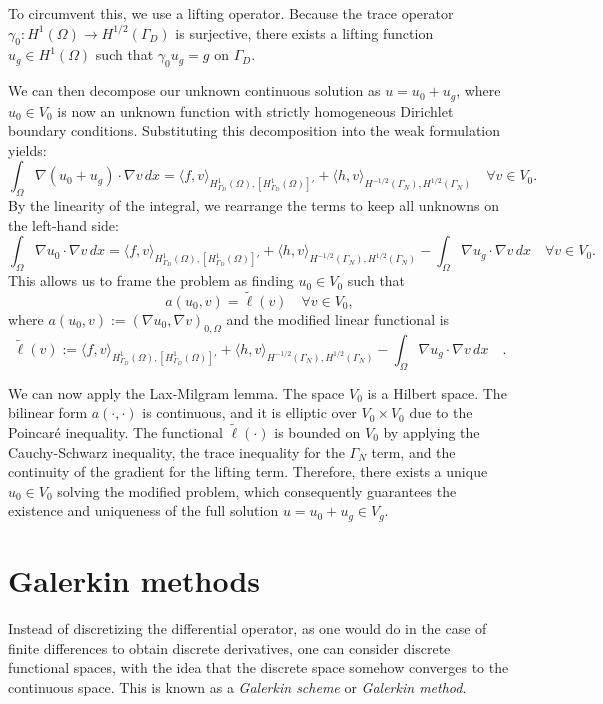 To circumvent this, we use a lifting operator. Because the trace operator $\gamma_0 : H^1(\Omega) \to H^{1/2}(\Gamma_D)$ is surjective, there exists a lifting function $u_g \in H^1(\Omega)$ such that $\gamma_0 u_g = g$ on $\Gamma_D$.

We can then decompose our unknown continuous solution as $u = u_0 + u_g$, where $u_0 \in V_0$ is now an unknown function with strictly homogeneous Dirichlet boundary conditions. Substituting this decomposition into the weak formulation yields:
$$ \int_\Omega \nabla(u_0 + u_g) \cdot \nabla v \, dx = \langle f,  v \rangle_{H^1_{\Gamma_D}(\Omega), [H^1_{\Gamma_D}(\Omega)]'} + \langle h,  v \rangle_{H^{-1/2}(\Gamma_N), H^{1/2}(\Gamma_N)} \quad \forall v \in V_0. $$
By the linearity of the integral, we rearrange the terms to keep all unknowns on the left-hand side:
$$ \int_\Omega \nabla u_0 \cdot \nabla v \, dx = \langle f,  v \rangle_{H^1_{\Gamma_D}(\Omega), [H^1_{\Gamma_D}(\Omega)]'} + \langle h,  v \rangle_{H^{-1/2}(\Gamma_N), H^{1/2}(\Gamma_N)} - \int_\Omega \nabla u_g \cdot \nabla v \, dx \quad \forall v \in V_0. $$
This allows us to frame the problem as finding $u_0 \in V_0$ such that
$$ a(u_0, v) = \tilde{\ell}(v) \quad \forall v \in V_0, $$
where $a(u_0, v) := (\nabla u_0, \nabla v)_{0,\Omega}$ and the modified linear functional is
$$ \tilde{\ell}(v) := \langle f,  v \rangle_{H^1_{\Gamma_D}(\Omega), [H^1_{\Gamma_D}(\Omega)]'} + \langle h,  v \rangle_{H^{-1/2}(\Gamma_N), H^{1/2}(\Gamma_N)} - \int_\Omega \nabla u_g \cdot \nabla v \, dx \quad. $$

We can now apply the Lax-Milgram lemma. The space $V_0$ is a Hilbert space. The bilinear form $a(\cdot, \cdot)$ is continuous, and it is elliptic over $V_0 \times V_0$ due to the Poincar\'e inequality. The functional $\tilde{\ell}(\cdot)$ is bounded on $V_0$ by applying the Cauchy-Schwarz inequality, the trace inequality for the $\Gamma_N$ term, and the continuity of the gradient for the lifting term. Therefore, there exists a unique $u_0 \in V_0$ solving the modified problem, which consequently guarantees the existence and uniqueness of the full solution $u = u_0 + u_g \in V_g$.

\section{Galerkin methods}\label{sec:galerkin}
Instead of discretizing the differential operator, as one would do in the case of finite differences to obtain discrete derivatives, one can consider discrete functional spaces, with the idea that the discrete space somehow converges to the continuous space. This is known as a \emph{Galerkin scheme} or \emph{Galerkin method}.

